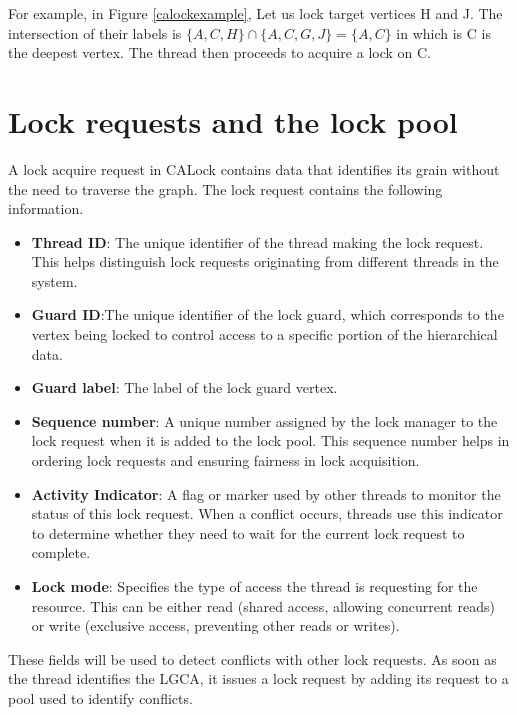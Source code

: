  For example, in Figure \ref{calockexample}, Let us lock target vertices H and J. The intersection of their labels is $\{A, C, H\} \cap \{A, C, G, J\} =  \{A,C\}$ in which is C is the deepest vertex. The thread then proceeds to acquire a lock on C. 


\section{Lock requests and the lock pool}

A lock acquire request in CALock contains data that identifies its grain without the need to traverse the graph. The lock request contains the following information.


\begin{itemize}
	\item \textbf{Thread ID}: The unique identifier of the thread making the lock request. This helps distinguish lock requests originating from different threads in the system.
	\item \textbf{Guard ID}:The unique identifier of the lock guard, which corresponds to the vertex being locked to control access to a specific portion of the hierarchical data.
	\item \textbf{Guard label}: The label of the lock guard vertex.
	\item \textbf{Sequence number}: A unique number assigned by the lock manager to the lock request when it is added to the lock pool. This sequence number helps in ordering lock requests and ensuring fairness in lock acquisition.
	\item \textbf{Activity Indicator}: A flag or marker used by other threads to monitor the status of this lock request. When a conflict occurs, threads use this indicator to determine whether they need to wait for the current lock request to complete.
	\item \textbf{Lock mode}: Specifies the type of access the thread is requesting for the resource. This can be either read (shared access, allowing concurrent reads) or write (exclusive access, preventing other reads or writes).
\end{itemize}

These fields will be used to detect conflicts with other lock requests. 
As soon as the thread identifies the LGCA, it issues a lock request by adding its request to a pool used to identify conflicts. 


